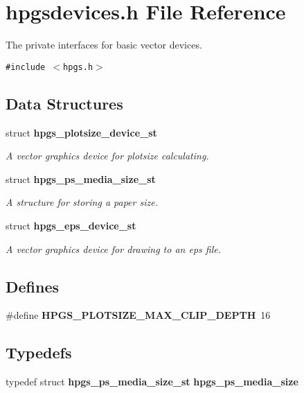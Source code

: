 \section{hpgsdevices.h File Reference}
\label{hpgsdevices_8h}
The private interfaces for basic vector devices. 

{\tt \#include $<$hpgs.h$>$}\par
\subsection*{Data Structures}
\begin{CompactItemize}
\item 
struct {\bf hpgs\_\-plotsize\_\-device\_\-st}
\begin{CompactList}\small\item\em A vector graphics device for plotsize calculating. \item\end{CompactList}\item 
struct {\bf hpgs\_\-ps\_\-media\_\-size\_\-st}
\begin{CompactList}\small\item\em A structure for storing a paper size. \item\end{CompactList}\item 
struct {\bf hpgs\_\-eps\_\-device\_\-st}
\begin{CompactList}\small\item\em A vector graphics device for drawing to an eps file. \item\end{CompactList}\end{CompactItemize}
\subsection*{Defines}
\begin{CompactItemize}
\item 
\#define \textbf{HPGS\_\-PLOTSIZE\_\-MAX\_\-CLIP\_\-DEPTH}~16\label{group__device_ge92b44de322e9c1b9fbd0f732aea9077}

\end{CompactItemize}
\subsection*{Typedefs}
\begin{CompactItemize}
\item 
typedef struct {\bf hpgs\_\-ps\_\-media\_\-size\_\-st} \textbf{hpgs\_\-ps\_\-media\_\-size}\label{group__device_g9bbe4ba684b8a07c23d89ee820f00574}

\end{CompactItemize}
